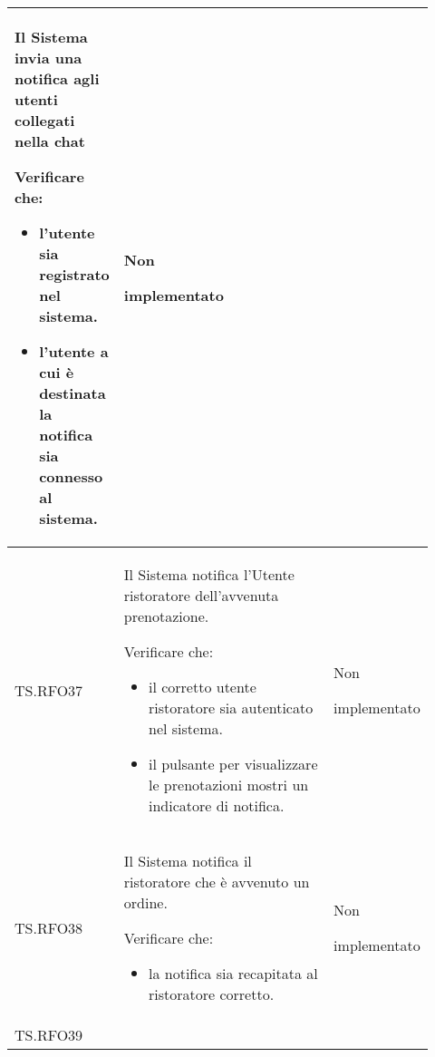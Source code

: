 \begin{longtable}{|p{0.10\linewidth}|p{0.70\linewidth}|p{0.12\linewidth}|}
	Il Sistema invia una notifica agli utenti collegati nella chat \par
	Verificare che:
	\begin{itemize}
		\item l'utente sia registrato nel sistema.
		\item l'utente a cui è destinata la notifica sia connesso al sistema.
	\end{itemize}                                                           &
	Non \par implementato                                                                                                                                                   \\
	\hline
	TS.RFO37                                                                                                                        &
	Il Sistema notifica l’Utente ristoratore dell’avvenuta prenotazione.  \par
	Verificare che:
	\begin{itemize}
		\item il corretto utente ristoratore sia autenticato nel sistema.
		\item il pulsante per visualizzare le prenotazioni mostri un indicatore di notifica.
	\end{itemize}                                            &
	Non \par implementato                                                                                                                                                   \\
	\hline
	TS.RFO38                                                                                                                        &
	Il Sistema notifica il ristoratore che è avvenuto un ordine.   \par
	Verificare che:
	\begin{itemize}
		\item la notifica sia recapitata al ristoratore corretto.
	\end{itemize}                                                                       &
	Non \par implementato                                                                                                                                                   \\
	\hline
	TS.RFO39                                                                                                                        &

\end{longtable}
